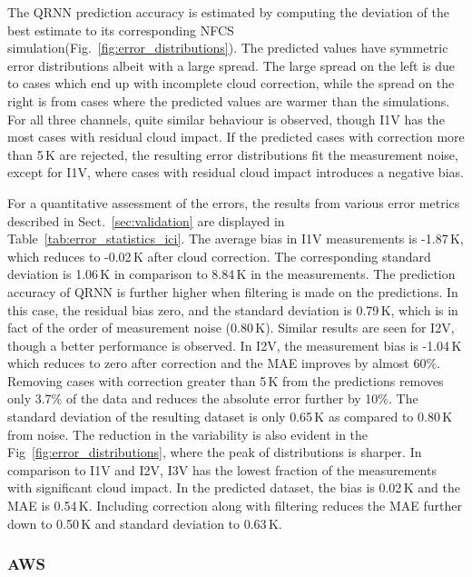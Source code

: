 \documentclass[amt, manuscript]{copernicus}
\begin{document}
The QRNN prediction accuracy is estimated by computing the deviation of the best estimate to its corresponding NFCS simulation(Fig.~\ref{fig:error_distributions}). The predicted values have symmetric error distributions albeit with a large spread. The large spread on the left is due to cases which end up with incomplete cloud correction, while the spread on the right is from cases where the predicted values are warmer than the simulations. For all three channels, quite similar behaviour is observed, though I1V has the most cases with residual cloud impact. If the predicted cases with correction more than 5\,K are rejected, the resulting error distributions fit the measurement noise, except for I1V, where cases with residual cloud impact introduces a negative bias. 

For a quantitative assessment of the errors, the results from various error metrics described in  Sect.~\ref{sec:validation} are displayed in Table~\ref{tab:error_statistics_ici}. The average bias in I1V measurements is -1.87\,K, which reduces to -0.02\,K after cloud correction. The corresponding standard deviation is 1.06\,K in comparison to 8.84\,K in the measurements. The prediction accuracy of QRNN is further higher when filtering is made on the predictions. In this case, the residual bias zero, and the standard deviation is 0.79\,K, which is in fact of the order of measurement noise (0.80\,K). Similar results are seen for I2V, though a better performance is observed. In I2V, the measurement bias is -1.04\,K which reduces to zero after correction and the MAE improves by almost 60\%. Removing cases with correction greater than 5\,K from the predictions removes only 3.7\% of the data and reduces the absolute error further by 10\%. The standard deviation of the resulting dataset is only 0.65\,K as compared to 0.80\,K from noise. The reduction in the variability is also evident in the Fig~\ref{fig:error_distributions}, where the peak of distributions is sharper. In comparison to I1V and I2V, I3V has the lowest fraction of the measurements with significant cloud impact. In the predicted dataset, the bias is 0.02\,K and the MAE is 0.54\,K. Including correction along with filtering reduces the MAE further down to 0.50\,K and standard deviation to 0.63\,K.  

\subsubsection{AWS}
\end{document}
